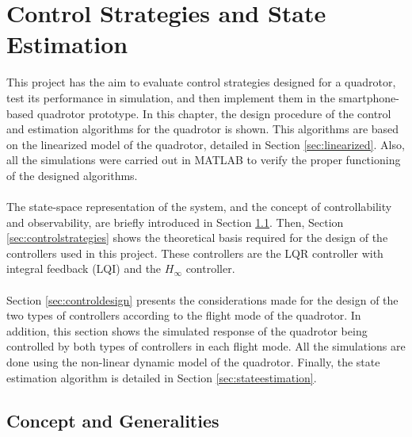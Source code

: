 \chapter{Control Strategies and State Estimation} \label{ch:controlandestimation}
This project has the aim to evaluate control strategies designed for a quadrotor, test its performance in simulation, and then implement them in the smartphone-based quadrotor prototype. In this chapter, the design procedure of the control and estimation algorithms for the quadrotor is shown. This algorithms are based on the linearized model of the quadrotor, detailed in Section \ref{sec:linearized}. Also, all the simulations were carried out in MATLAB to verify the proper functioning of the designed algorithms.
\\\\
The state-space representation of the system, and the concept of controllability and observability, are briefly introduced in Section \ref{sec:generalities}. Then, Section \ref{sec:controlstrategies} shows the theoretical basis required for the design of the controllers used in this project. These controllers are the LQR controller with integral feedback (LQI) and the $H_\infty$ controller.
\\\\
Section \ref{sec:controldesign} presents the considerations made for the design of the two types of controllers according to the flight mode of the quadrotor. In addition, this section shows the simulated response of the quadrotor being controlled by both types of controllers in each flight mode. All the simulations are done using the non-linear dynamic model of the quadrotor. Finally, the state estimation algorithm is detailed in Section \ref{sec:stateestimation}.

\section{Concept and Generalities}
\label{sec:generalities}
